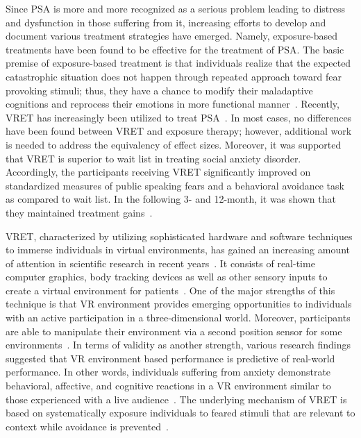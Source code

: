 \documentclass{llncs}
\begin{document}
Since PSA is more and more recognized as a serious problem leading to distress and dysfunction in those suffering from it, increasing efforts to develop and document various treatment strategies have emerged. Namely, exposure-based treatments have been found to be effective for the treatment of PSA. The basic premise of exposure-based treatment is that individuals realize that the expected catastrophic situation does not happen through repeated approach toward fear provoking stimuli; thus, they have a chance to modify their maladaptive cognitions and reprocess their emotions in more functional manner~\cite{hindo2011one}. Recently, VRET has increasingly been utilized to treat PSA~\cite{anderson2005cognitive,harris2002brief,safir2012virtual,wallach2009virtual}. In most cases, no differences have been found between VRET and exposure therapy; however, additional work is needed to address the equivalency of effect sizes. Moreover, it was supported that VRET is superior to wait list in treating social anxiety disorder. Accordingly, the participants receiving VRET significantly improved on standardized measures of public speaking fears and a behavioral avoidance task as compared to wait list. In the following 3- and 12-month, it was shown that they maintained treatment gains~\cite{anderson2013virtual}.


VRET, characterized by utilizing sophisticated hardware and software techniques to immerse individuals in virtual environments, has gained an increasing amount of attention in scientific research in recent years~\cite{diemer2016fear}. It consists of real-time computer graphics, body tracking devices as well as other sensory inputs to create a virtual environment for patients~\cite{oprics2012virtual}. One of the major strengths of this technique is that VR environment provides emerging opportunities to individuals with an active participation in a three-dimensional world. Moreover, participants are able to manipulate their environment via a second position sensor for some environments~\cite{anderson2004computer}. In terms of validity as another strength, various research findings suggested that VR environment based performance is predictive of real-world performance. In other words, individuals suffering from anxiety demonstrate behavioral, affective, and cognitive reactions in a VR environment similar to those experienced with a live audience~\cite{brundage2015real}. The underlying mechanism of VRET is based on systematically exposure individuals to feared stimuli that are relevant to context while avoidance is prevented~\cite{burstin2010virtual,oprics2012virtual}.
\end{document}
